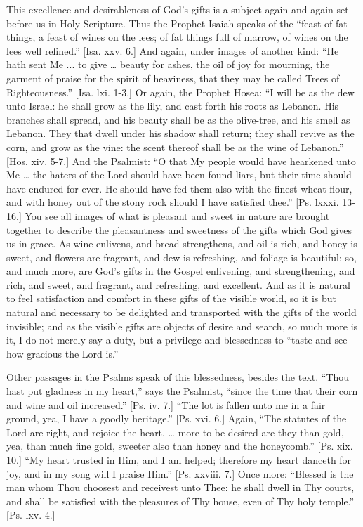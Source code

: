 This excellence and desirableness of God's gifts is a
subject again and again set before us in Holy Scripture.
Thus the Prophet Isaiah speaks of the ``feast of fat
things, a feast of wines on the lees; of fat things full
of marrow, of wines on the lees well refined.'' [Isa.
xxv. 6.] And again, under images of another kind:
``He hath sent Me ... to give … beauty for
ashes, the oil of joy for mourning, the garment of praise
for the spirit of heaviness, that they may be called
Trees of Righteousness.'' [Isa. lxi. 1-3.] Or again,
the Prophet Hosea: ``I will be as the dew unto
Israel: he shall grow as the lily, and cast forth his
roots as Lebanon. His branches shall spread, and his
beauty shall be as the olive-tree, and his smell as
Lebanon. They that dwell under his shadow shall return;
they shall revive as the corn, and grow as the vine: the
scent thereof shall be as the wine of Lebanon.''
[Hos. xiv. 5-7.] And the Psalmist: ``O that My people
would have hearkened unto Me … the haters of the
Lord should have been found liars, but their time should
have endured for ever. He should have fed them also with
the finest wheat flour, and with honey out of the stony
rock should I have satisfied thee.'' [Ps. lxxxi.
13-16.] You see all images of what is pleasant and sweet
in nature are brought together to describe the
pleasantness and sweetness of the gifts which God gives
us in grace. As wine enlivens, and bread strengthens, and
oil is rich, and honey is sweet, and flowers are
fragrant, and dew is refreshing, and foliage is
beautiful; so, and much more, are God's gifts in the
Gospel enlivening, and strengthening, and rich, and
sweet, and fragrant, and refreshing, and excellent. And
as it is natural to feel satisfaction and comfort in
these gifts of the visible world, so it is but natural
and necessary to be delighted and transported with the
gifts of the world invisible; and as the visible gifts
are objects of desire and search, so much more is it, I
do not merely say a duty, but a privilege and blessedness
to ``taste and see how gracious the Lord is.''

Other passages in the Psalms speak of this
blessedness, besides the text. ``Thou hast put
gladness in my heart,'' says the Psalmist,
``since the time that their corn and wine and oil
increased.'' [Ps. iv. 7.] ``The lot is fallen unto me in a fair ground, yea, I have a goodly
heritage.'' [Ps. xvi. 6.] Again, ``The statutes
of the Lord are right, and rejoice the heart, … more
to be desired are they than gold, yea, than much fine
gold, sweeter also than honey and the honeycomb.''
[Ps. xix. 10.] ``My heart trusted in Him, and I am
helped; therefore my heart danceth for joy, and in
my song will I praise Him.'' [Ps. xxviii. 7.] Once
more: ``Blessed is the man whom Thou choosest and
receivest unto Thee: he shall dwell in Thy courts, and
shall be satisfied with the pleasures of Thy house, even
of Thy holy temple.'' [Ps. lxv. 4.]

